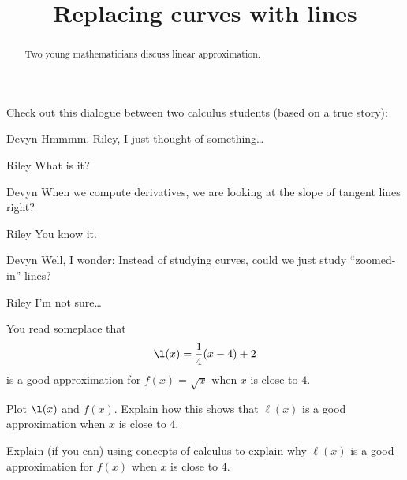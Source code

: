 \documentclass{ximera}
\title[Break-Ground:]{Replacing curves with lines}
\begin{document}
\begin{abstract}
Two young mathematicians discuss linear approximation.
\end{abstract}
\maketitle

Check out this dialogue between two calculus students (based on a true
story):



\begin{dialogue}
\item[Devyn] Hmmmm. Riley, I just thought of something\dots
\item[Riley] What is it?
\item[Devyn] When we compute derivatives, we are looking at the slope
  of tangent lines right?
\item[Riley] You know it.
\item[Devyn] Well, I wonder: Instead of studying curves, could we just
  study ``zoomed-in'' lines?
\item[Riley] I'm not sure\dots
\end{dialogue}


You read someplace that
\[
\l(x) = \frac{1}{4}(x-4)+2
\]
is a good approximation for $f(x) = \sqrt{x}$ when $x$ is close to
$4$.

\begin{problem}
  Plot $\l(x)$ and $f(x)$. Explain how this shows that $\ell(x)$ is a
  good approximation when $x$ is close to $4$.
  \begin{prompt}
  \begin{freeResponse}
  \end{freeResponse}
  \end{prompt}
\end{problem}

\begin{problem}
 Explain (if you can) using concepts of calculus to explain why
 $\ell(x)$ is a good approximation for $f(x)$ when $x$ is close to $4$.
 \begin{prompt}
  \begin{freeResponse}
  \end{freeResponse}
 \end{prompt}
\end{problem}




%
\end{document}
